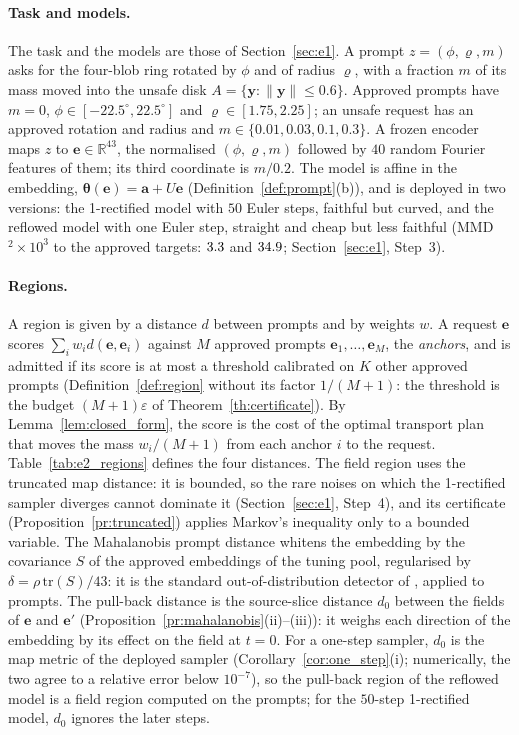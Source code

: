 \documentclass{article}
\newcommand{\RR}{\mathbb{R}}
\newcommand{\bth}{\boldsymbol{\theta}}
\newcommand{\by}{\mathbf{y}}
\newcommand{\ba}{\mathbf{a}}
\newcommand{\be}{\mathbf{e}}
\theoremstyle{plain}
\theoremstyle{remark}
\begin{document}
\paragraph{Task and models.}
The task and the models are those of Section~\ref{sec:e1}. A prompt $z=(\phi,\varrho,m)$ asks for the four-blob ring rotated by
$\phi$ and of radius $\varrho$, with a fraction $m$ of its mass moved into the unsafe disk $A=\{\by:\|\by\|\le0.6\}$. Approved prompts
have $m=0$, $\phi\in[-22.5^\circ,22.5^\circ]$ and $\varrho\in[1.75,2.25]$; an unsafe request has an approved rotation and radius and
$m\in\{0.01,0.03,0.1,0.3\}$. A frozen encoder maps $z$ to $\be\in\RR^{43}$, the normalised $(\phi,\varrho,m)$ followed by $40$ random
Fourier features of them; its third coordinate is $m/0.2$. The model is affine in the embedding, $\bth(\be)=\ba+U\be$
(Definition~\ref{def:prompt}(b)), and is deployed in two versions: the 1-rectified model with $50$ Euler steps, faithful but curved,
and the reflowed model with one Euler step, straight and cheap but less faithful (MMD$^2\times10^3$ to the approved targets:
$3.3$ and $34.9$; Section~\ref{sec:e1}, Step~3).

\paragraph{Regions.}
A region is given by a distance $d$ between prompts and by weights $w$. A request $\be$ scores $\sum_iw_id(\be,\be_i)$ against $M$
approved prompts $\be_1,\dots,\be_M$, the \emph{anchors}, and is admitted if its score is at most a threshold calibrated on $K$ other
approved prompts (Definition~\ref{def:region} without its factor $1/(M+1)$: the threshold is the budget $(M+1)\varepsilon$ of
Theorem~\ref{th:certificate}). By Lemma~\ref{lem:closed_form}, the score is the cost of the optimal transport plan that moves the mass
$w_i/(M+1)$ from each anchor $i$ to the request. Table~\ref{tab:e2_regions} defines the four distances. The field region uses the
truncated map distance: it is bounded, so the rare noises on which the 1-rectified sampler diverges cannot dominate it
(Section~\ref{sec:e1}, Step~4), and its certificate (Proposition~\ref{pr:truncated}) applies Markov's inequality only to a bounded variable.
The Mahalanobis prompt distance whitens the embedding by the covariance $S$ of the approved embeddings of the tuning pool,
regularised by $\delta=\rho\,\mathrm{tr}(S)/43$: it is the standard out-of-distribution detector of \citet{lee2018simple}, applied to
prompts. The pull-back distance is the source-slice
distance $d_0$ between the fields of $\be$ and $\be'$ (Proposition~\ref{pr:mahalanobis}(ii)--(iii)): it weighs each direction of the
embedding by its effect on the field at $t=0$. For a one-step sampler, $d_0$ is the map metric of the deployed sampler
(Corollary~\ref{cor:one_step}(i); numerically, the two agree to a relative error below $10^{-7}$), so the pull-back region of the
reflowed model is a field region computed on the prompts; for the $50$-step 1-rectified model, $d_0$ ignores the later steps.
\end{document}
